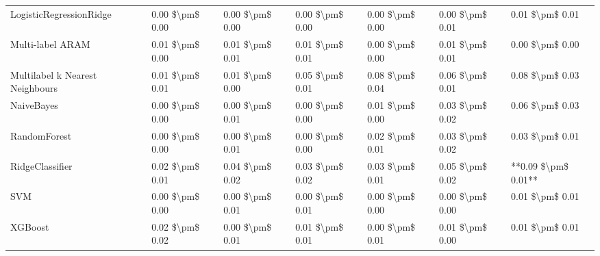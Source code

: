 \begin{tabular}{lllllll}
        LogisticRegressionRidge & 0.00 \$\textbackslash pm\$ 0.00 &           0.00 \$\textbackslash pm\$ 0.00 &       0.00 \$\textbackslash pm\$ 0.00 &        0.00 \$\textbackslash pm\$ 0.00 &                         0.00 \$\textbackslash pm\$ 0.01 &     0.01 \$\textbackslash pm\$ 0.01 \\
               Multi-label ARAM & 0.01 \$\textbackslash pm\$ 0.00 &           0.01 \$\textbackslash pm\$ 0.01 &       0.01 \$\textbackslash pm\$ 0.01 &        0.00 \$\textbackslash pm\$ 0.00 &                         0.01 \$\textbackslash pm\$ 0.01 &     0.00 \$\textbackslash pm\$ 0.00 \\
Multilabel k Nearest Neighbours & 0.01 \$\textbackslash pm\$ 0.01 &           0.01 \$\textbackslash pm\$ 0.00 &       0.05 \$\textbackslash pm\$ 0.01 &        0.08 \$\textbackslash pm\$ 0.04 &                         0.06 \$\textbackslash pm\$ 0.01 &     0.08 \$\textbackslash pm\$ 0.03 \\
                     NaiveBayes & 0.00 \$\textbackslash pm\$ 0.00 &           0.00 \$\textbackslash pm\$ 0.01 &       0.00 \$\textbackslash pm\$ 0.00 &        0.01 \$\textbackslash pm\$ 0.00 &                         0.03 \$\textbackslash pm\$ 0.02 &     0.06 \$\textbackslash pm\$ 0.03 \\
                   RandomForest & 0.00 \$\textbackslash pm\$ 0.00 &           0.00 \$\textbackslash pm\$ 0.01 &       0.00 \$\textbackslash pm\$ 0.00 &        0.02 \$\textbackslash pm\$ 0.01 &                         0.03 \$\textbackslash pm\$ 0.02 &     0.03 \$\textbackslash pm\$ 0.01 \\
                RidgeClassifier & 0.02 \$\textbackslash pm\$ 0.01 &           0.04 \$\textbackslash pm\$ 0.02 &       0.03 \$\textbackslash pm\$ 0.02 &        0.03 \$\textbackslash pm\$ 0.01 &                         0.05 \$\textbackslash pm\$ 0.02 & **0.09 \$\textbackslash pm\$ 0.01** \\
                            SVM & 0.00 \$\textbackslash pm\$ 0.00 &           0.00 \$\textbackslash pm\$ 0.01 &       0.00 \$\textbackslash pm\$ 0.01 &        0.00 \$\textbackslash pm\$ 0.00 &                         0.00 \$\textbackslash pm\$ 0.00 &     0.01 \$\textbackslash pm\$ 0.01 \\
                        XGBoost & 0.02 \$\textbackslash pm\$ 0.02 &           0.00 \$\textbackslash pm\$ 0.01 &       0.01 \$\textbackslash pm\$ 0.01 &        0.00 \$\textbackslash pm\$ 0.01 &                         0.01 \$\textbackslash pm\$ 0.00 &     0.01 \$\textbackslash pm\$ 0.01 \\
\bottomrule
\end{tabular}
